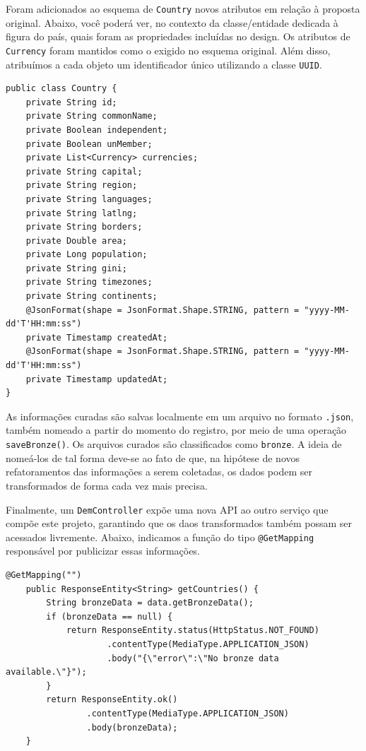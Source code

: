\documentclass[12pt]{article}
\begin{document}
\quad Foram adicionados ao esquema de \texttt{Country} novos atributos em relação à proposta original. Abaixo, você poderá ver, no contexto da classe/entidade dedicada à figura do país, quais foram as propriedades incluídas no design. Os atributos de \texttt{Currency} foram mantidos como o exigido no esquema original. Além disso, atribuímos a cada objeto um identificador único utilizando a classe \texttt{UUID}.

\begin{lstlisting}[style=vscode]
public class Country {
    private String id;
    private String commonName;
    private Boolean independent;
    private Boolean unMember;
    private List<Currency> currencies;
    private String capital;
    private String region;
    private String languages;
    private String latlng;
    private String borders;
    private Double area;
    private Long population;
    private String gini;
    private String timezones;
    private String continents;
    @JsonFormat(shape = JsonFormat.Shape.STRING, pattern = "yyyy-MM-dd'T'HH:mm:ss")
    private Timestamp createdAt;
    @JsonFormat(shape = JsonFormat.Shape.STRING, pattern = "yyyy-MM-dd'T'HH:mm:ss")
    private Timestamp updatedAt;
}
\end{lstlisting}

\quad As informações curadas são salvas localmente em um arquivo no formato \texttt{.json}, também nomeado a partir do momento do registro, por meio de uma operação \texttt{saveBronze()}. Os arquivos curados são classificados como \texttt{bronze}. A ideia de nomeá-los de tal forma deve-se ao fato de que, na hipótese de novos refatoramentos das informações a serem coletadas, os dados podem ser transformados de forma cada vez mais precisa.

\quad Finalmente, um \texttt{DemController} expõe uma nova API ao outro serviço que compõe este projeto, garantindo que os daos transformados também possam ser acessados livremente. Abaixo, indicamos a função do tipo \texttt{@GetMapping} responsável por publicizar essas informações.

\begin{lstlisting}[style=vscode]
@GetMapping("")
    public ResponseEntity<String> getCountries() {
        String bronzeData = data.getBronzeData();
        if (bronzeData == null) {
            return ResponseEntity.status(HttpStatus.NOT_FOUND)
                    .contentType(MediaType.APPLICATION_JSON)
                    .body("{\"error\":\"No bronze data available.\"}");
        }
        return ResponseEntity.ok()
                .contentType(MediaType.APPLICATION_JSON)
                .body(bronzeData);
    }
\end{lstlisting}
\end{document}

